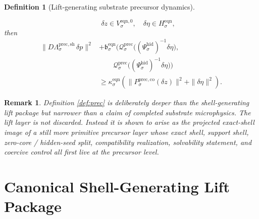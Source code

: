 \documentclass[11pt]{article}
\newcommand{\EqnPair}[1]{\mathfrak b_{#1}^{\mathrm{eqn}}}
\newcommand{\EqnHidden}[1]{H_{#1}^{\mathrm{eqn}}}
\newcommand{\EqnZero}[1]{V_{#1}^{\mathrm{eqn},0}}
\newcommand{\HiddenChart}[1]{\Psi_{#1}^{\mathrm{hid}}}
\newcommand{\PrecShellMap}[1]{\Lambda_{#1}^{\mathrm{prec,sh}}}
\newcommand{\PrecCharge}[1]{\mathcal Q_{#1}^{\mathrm{prec}}}
\newcommand{\PrecStateComp}[1]{P_{#1}^{\mathrm{prec,co}}}
\newtheorem{definition}{Definition}
\newtheorem{remark}{Remark}
\begin{document}
\begin{definition}[Lift-generating substrate precursor dynamics]
\begin{enumerate}
\[    \qquad
    \delta z\in\EqnZero{\sigma},
    \quad
    \delta\eta\in\EqnHidden{\sigma},
    \]
    then
    \begin{equation}
    \begin{aligned}
    \|D\PrecShellMap{\sigma}\,\delta p\|^{2}
    &+
    \EqnPair{\sigma}\bigl(
    \PrecCharge{\sigma}\bigl((\HiddenChart{\sigma})^{-1}\delta\eta\bigr),\\
    &\qquad
    \PrecCharge{\sigma}\bigl((\HiddenChart{\sigma})^{-1}\delta\eta\bigr)
    \bigr)
    \\
    &\ge
    \kappa_{\sigma}^{\mathrm{eqn}}
    \left(
    \|\PrecStateComp{\sigma}(\delta z)\|^{2}
    +
    \|\delta\eta\|^{2}
    \right).
    \end{aligned}
    \label{eq:preccoercive}
    \end{equation}
\end{enumerate}
\end{definition}

\begin{remark}
Definition \ref{def:prec} is deliberately deeper than the shell-generating lift package but narrower than a claim of completed substrate microphysics. The lift layer is not discarded. Instead it is shown to arise as the projected exact-shell image of a still more primitive precursor layer whose exact shell, support shell, zero-core / hidden-seed split, compatibility realization, solvability statement, and coercive control all first live at the precursor level.
\end{remark}

\section{Canonical Shell-Generating Lift Package}
\end{document}
